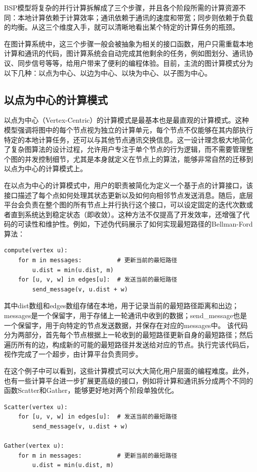 BSP模型将复杂的并行计算拆解成了三个步骤，并且各个阶段所需的计算资源不同：本地计算依赖于计算效率；通讯依赖于通讯的速度和带宽；同步则依赖于负载的均衡。从这三个维度入手，就可以清晰地看出某个特定的计算任务的瓶颈。

在图计算系统中，这三个步骤一般会被抽象为相关的接口函数，用户只需重载本地计算和通讯的代码，图计算系统会自动完成其他剩余的任务，例如图划分、通讯协议、同步信号等等，给用户带来了便利的编程体验。目前，主流的图计算模式分为以下几种：以点为中心、以边为中心、以块为中心、以子图为中心。

\subsection{以点为中心的计算模式}

以点为中心（Vertex-Centric）的计算模式是最基本也是最直观的计算模式。这种模型强调将图中的每个节点视为独立的计算单元，每个节点不仅能够在其内部执行特定的本地计算任务，还可以与其他节点通讯交换信息。这一设计理念极大地简化了复杂图算法的设计过程，允许用户专注于单个节点的行为逻辑，而不需要管理整个图的并发控制细节，尤其是本身就定义在节点上的算法，能够非常自然的迁移到以点为中心的计算模式上。

在以点为中心的计算模式中，用户的职责被简化为定义一个基于点的计算接口，该接口描述了每个点如何处理其状态更新以及如何向相邻节点发送消息。随后，底层平台会负责在整个图的所有节点上并行执行这个接口，可以设定固定的迭代次数或者直到系统达到稳定状态（即收敛）。这种方法不仅提高了开发效率，还增强了代码的可读性和维护性。例如，下述伪代码展示了如何实现最短路径的Bellman-Ford算法：
\begin{lstlisting}
compute(vertex u):
    for m in messages:          # 更新当前的最短路径
        u.dist = min(u.dist, m)
    for [u, v, w] in edges[u]:  # 发送当前的最短路径
        send_message(v, u.dist + w)
\end{lstlisting}
其中dist数组和edges数组存储在本地，用于记录当前的最短路径距离和出边；messages是一个保留字，用于存储上一轮通讯中收到的数据；send\_message也是一个保留字，用于向特定的节点发送数据，并保存在对应的messages中。
该代码分为两部分，首先每个节点根据上一轮收到的最短路径更新自身的最短路径；然后遍历所有的边，构成新的可能的最短路径并发送给对应的节点。执行完该代码后，视作完成了一个超步，由计算平台负责同步。

在这个例子中可以看到，这些计算模式可以大大简化用户层面的编程难度。此外，也有一些计算平台进一步扩展更高级的接口，例如将计算和通讯拆分成两个不同的函数Scatter和Gather，能够更好地对两个阶段单独优化。
\begin{lstlisting}
Scatter(vertex u):
    for [u, v, w] in edges[u]:  # 发送当前的最短路径
        send_message(v, u.dist + w)

Gather(vertex u):
    for m in messages:          # 更新当前的最短路径
        u.dist = min(u.dist, m)
\end{lstlisting}

